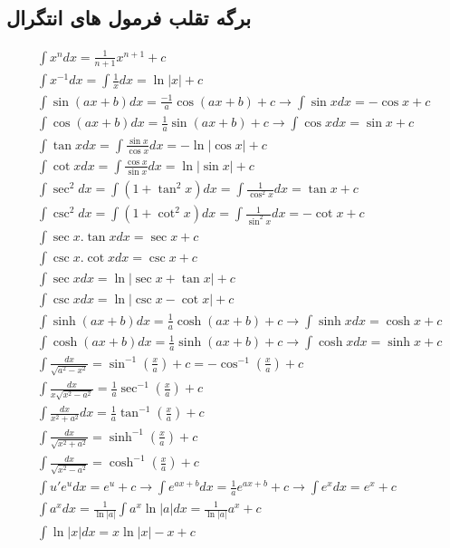 \newpage
\subsection{برگه تقلب فرمول های انتگرال}
\begin{align*}
&\int x^n dx = \frac{1}{n+1}x^{n+1}+c \\
&\int x^{-1} dx = \int \frac{1}{x} dx = \ln|x|+c \\
&\int \sin (ax+b) dx = \frac{-1}{a} \cos(ax+b)+c \to \int \sin x dx = -\cos x+c \\
&\int \cos (ax+b) dx = \frac{1}{a} \sin(ax+b)+c  \to \int \cos x dx = \sin x+c \\
&\int \tan x dx = \int \frac{\sin x}{\cos x} dx = -\ln|\cos x|+c \\
&\int \cot x dx = \int \frac{\cos x}{\sin x} dx = \ln|\sin x|+c \\
&\int \sec^2 dx = \int (1+\tan^2 x) dx = \int \frac{1}{\cos^2 x} dx = \tan x + c \\
&\int \csc^2 dx = \int (1+\cot^2 x) dx = \int \frac{1}{\sin^2 x} dx = -\cot x + c \\
&\int \sec x.\tan x dx = \sec x + c \\
&\int \csc x.\cot x dx = \csc x + c \\
&\int \sec x dx = \ln|\sec x+\tan x|+c \\
&\int \csc x dx = \ln|\csc x-\cot x|+c \\
&\int \sinh (ax+b) dx = \frac{1}{a} \cosh (ax+b) + c \to \int \sinh x dx = \cosh x + c \\
&\int \cosh (ax+b) dx = \frac{1}{a} \sinh (ax+b) + c \to \int \cosh x dx = \sinh x + c \\
&\int \frac{dx}{\sqrt{a^2-x^2}} = \sin^{-1} (\frac{x}{a}) + c = -\cos^{-1} (\frac{x}{a}) + c \\
&\int \frac{dx}{x\sqrt{x^2-a^2}} = \frac{1}{a} \sec^{-1} (\frac{x}{a}) + c \\
&\int \frac{dx}{x^2+a^2} dx = \frac{1}{a} \tan^{-1} (\frac{x}{a}) + c \\
&\int \frac{dx}{\sqrt{x^2+a^2}} = \sinh^{-1} (\frac{x}{a}) + c \\
&\int \frac{dx}{\sqrt{x^2-a^2}} = \cosh^{-1} (\frac{x}{a}) + c \\
&\int u'e^u dx = e^u + c \to \int e^{ax+b} dx = \frac{1}{a} e^{ax+b} + c \to \int e^x dx = e^x + c \\
&\int a^x dx = \frac{1}{\ln|a|} \int a^x \ln|a| dx = \frac{1}{\ln|a|} a^x + c  \\
&\int \ln|x| dx = x\ln|x| - x + c \\
\end{align*}

